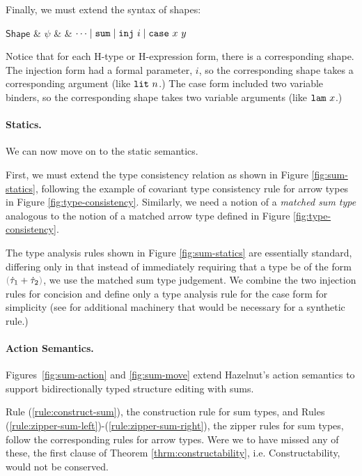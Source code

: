 Finally, we must extend the syntax of shapes:
\begin{grammar}
$\mathsf{Shape}$ & $\psi$ & \bnfas & $\cdots \mathrel{\mid} \mathtt{sum} \mathrel{\mid} \mathtt{inj}~i \mathrel{\mid} \mathtt{case}~x~y$
\end{grammar}
Notice that for each H-type or H-expression form, there is a corresponding
shape. The injection form had a formal parameter, $i$, so the corresponding
shape takes a corresponding argument (like $\mathtt{lit}~n$.) The case form
included two variable binders, so the corresponding shape takes two
variable arguments (like $\mathtt{lam}~x$.)



\paragraph{Statics.}
We can now move on to the static semantics.

First, we must extend the type consistency relation as shown in
Figure \ref{fig:sum-statics}, following the example of covariant type
consistency rule for arrow types in
Figure \ref{fig:type-consistency}. Similarly, we need a notion of
a \emph{matched sum type} analogous to the notion of a matched
arrow type defined in Figure \ref{fig:type-consistency}.

The type analysis rules shown in Figure \ref{fig:sum-statics} are
essentially standard, differing only in that instead of immediately
requiring that a type be of the form $\tsum{\htau_1}{\htau_2}$, we use the
matched sum type judgement. We combine the two injection rules for
concision and define only a type analysis rule for the case form for
simplicity (see \cite{DBLP:conf/popl/CiminiS16} for additional machinery
that would be necessary for a synthetic rule.)


\paragraph{Action Semantics.}
Figures~\ref{fig:sum-action} and \ref{fig:sum-move} extend Hazelnut's
action semantics to support bidirectionally typed structure editing with sums.
%

Rule (\ref{rule:construct-sum}), the construction rule for sum types, and
Rules (\ref{rule:zipper-sum-left})-(\ref{rule:zipper-sum-right}), the
zipper rules for sum types, follow the corresponding rules for arrow
types. Were we to have missed any of these, the first clause of
Theorem \ref{thrm:constructability}, i.e. Constructability, would not be
conserved.

